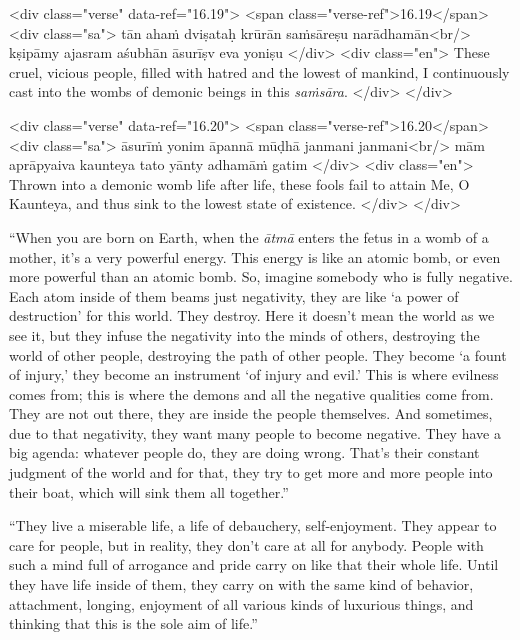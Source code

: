 \begin{html}
<div class="verse" data-ref="16.19">
  <span class="verse-ref">16.19</span>
  <div class="sa">
    tān ahaṁ dviṣataḥ krūrān saṁsāreṣu narādhamān<br/>
    kṣipāmy ajasram aśubhān āsurīṣv eva yoniṣu
  </div>
  <div class="en">
    These cruel, vicious people, filled with hatred and the lowest of mankind, I continuously cast into the wombs of demonic beings in this \textit{saṁsāra}.
  </div>
</div>
\end{html}



\begin{html}
<div class="verse" data-ref="16.20">
  <span class="verse-ref">16.20</span>
  <div class="sa">
    āsurīṁ yonim āpannā mūḍhā janmani janmani<br/>
    mām aprāpyaiva kaunteya tato yānty adhamāṁ gatim
  </div>
  <div class="en">
    Thrown into a demonic womb life after life, these fools fail to attain Me, O Kaunteya, and thus sink to the lowest state of existence.
  </div>
</div>
\end{html}


\enquote{When you are born on Earth, when the \textit{ātmā} enters the fetus in a womb of a mother, it’s a very powerful energy. This energy is like an atomic bomb, or even more powerful than an atomic bomb. So, imagine somebody who is fully negative. Each atom inside of them beams just negativity, they are like \enquote{a power of destruction} for this world. They destroy. Here it doesn’t mean the world as we see it, but they infuse the negativity into the minds of others, destroying the world of other people, destroying the path of other people. They become \enquote{a fount of injury,} they become an instrument \enquote{of injury and evil.} This is where evilness comes from; this is where the demons and all the negative qualities come from. They are not out there, they are inside the people themselves. And sometimes, due to that negativity, they want many people to become negative. They have a big agenda: whatever people do, they are doing wrong. That’s their constant judgment of the world and for that, they try to get more and more people into their boat, which will sink them all together.}

\enquote{They live a miserable life, a life of debauchery, self-enjoyment. They appear to care for people, but in reality, they don’t care at all for anybody. People with such a mind full of arrogance and pride carry on like that their whole life. Until they have life inside of them, they carry on with the same kind of behavior, attachment, longing, enjoyment of all various kinds of luxurious things, and thinking that this is the sole aim of life.}

